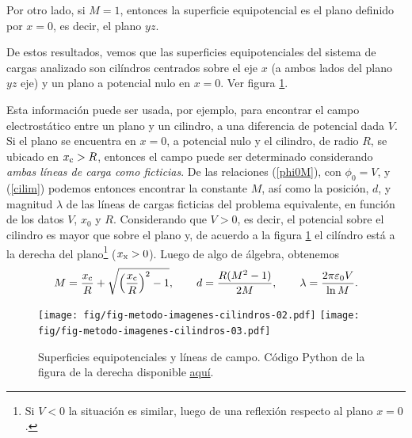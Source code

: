 Por otro lado, si $M=1$, entonces la superficie equipotencial es el plano
definido por $x=0$, es decir, el plano $yz$.

De estos resultados, vemos que las superficies equipotenciales del sistema de
cargas analizado son cilíndros centrados sobre el eje $x$ (a ambos lados del
plano $yz$ eje) y un plano a potencial nulo en $x=0$. Ver figura \ref{ci04}.
%

Esta información puede ser usada, por ejemplo, para encontrar el campo
electrostático entre un plano y un cilindro, a una diferencia de potencial
dada $V$. Si el plano se encuentra en $x=0$, a potencial nulo y el cilindro, de
radio $R$, se ubicado en $x_{\rm c}>R$, entonces el campo puede ser determinado
considerando \textit{ambas líneas de carga como ficticias}. De las relaciones
(\ref{phi0M}), con $\phi_0=V$, y (\ref{cilim}) podemos entonces encontrar la
constante $M$, así como la posición, $d$, y magnitud $\lambda$ de las líneas
de cargas ficticias del problema equivalente, en función de los datos $V$,
$x_0$ y $R$. Considerando que $V>0$, es decir, el potencial sobre el cilindro es mayor que sobre el plano y, de acuerdo a la figura \ref{ci04} el cilíndro está a la derecha del plano\footnote{Si $V<0$ la situación es similar, luego de una reflexión respecto al plano $x=0$.} ($x_{\rm x}>0$). Luego de algo de álgebra, obtenemos
\begin{equation}
 M=\frac{x_{\rm c}}{R}+\sqrt{\left(\frac{x_{\rm c}}{R}\right)^2-1}, \qquad
d=\frac{R(M^2-1)}{2M}, \qquad \lambda=\frac{2\pi\varepsilon_0V}{\ln M}.
\end{equation}
\begin{figure}[!h]
\centerline{\texttt{[image: fig/fig-metodo-imagenes-cilindros-02.pdf]}
\hspace{1cm}
\texttt{[image: fig/fig-metodo-imagenes-cilindros-03.pdf]}}
\caption{Superficies equipotenciales y líneas de campo. Código Python de la figura de la derecha disponible \href{https://github.com/gfrubi/electrodinamica/blob/master/figuras-editables/fig-metodo-imagenes-cilindros-03.py}{aquí}.}
\label{ci04}
\end{figure}

